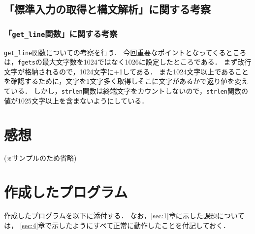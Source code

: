 \subsection{「標準入力の取得と構文解析」に関する考察}

\subsubsection{「\texttt{get\_line}関数」に関する考察}

\verb|get_line|関数についての考察を行う．
今回重要なポイントとなってくるところは，\verb|fgets|の最大文字数を1024ではなく1026に設定したところである．
まず改行文字が格納されるので，1024文字に+1してある．
また1024文字以上であることを確認するために，文字を1文字多く取得しそこに文字があるかで返り値を変えている．
しかし，\verb|strlen|関数は終端文字をカウントしないので，\verb|strlen|関数の値が1025文字以上を含まないようにしている．


\section{感想} \label{sec:6}

(※サンプルのため省略)

\section{作成したプログラム} \label{sec:7}

作成したプログラムを以下に添付する．
なお，\ref{sec:1}章に示した課題については，
\ref{sec:4}章で示したようにすべて正常に動作したことを付記しておく．

